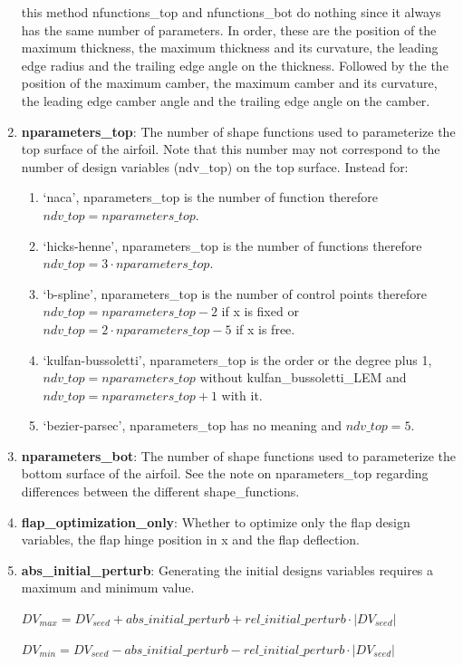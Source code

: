 \documentclass[11pt]{article}
\begin{document}
\begin{enumerate}
{\begin{enumerate}
	this method nfunctions\_top and nfunctions\_bot do nothing since it always has the same number
	of parameters. In order, these are the position of the maximum thickness, the maximum thickness and its curvature,
	the leading edge radius and the trailing edge angle on the thickness. Followed by the the position of the maximum camber, the maximum camber and its curvature, the leading edge camber angle and the trailing edge angle on the camber. 
\end{enumerate}}
\item{\textbf{nparameters\_top}: The number of shape functions used to parameterize the top
	surface of the airfoil.  Note that this number may not correspond to the number of design variables (ndv\_top)
	on the top surface. Instead for:
	\begin{enumerate}
		\item  `naca', nparameters\_top is the number of function therefore $ndv\_top=nparameters\_top$.
		\item `hicks-henne', nparameters\_top is the number of functions therefore $ndv\_top=3 \cdot nparameters\_top$.
		\item `b-spline', nparameters\_top is the number of control points therefore $ndv\_top=nparameters\_top - 2$ if x is fixed or $ndv\_top=2 \cdot nparameters\_top - 5$ if x is free.
		\item `kulfan-bussoletti', nparameters\_top is the order or the degree plus 1, $ndv\_top=nparameters\_top$ without kulfan\_bussoletti\_LEM and $ndv\_top=nparameters\_top + 1$ with it.
		\item `bezier-parsec', nparameters\_top has no meaning and $ndv\_top=5$. 
	\end{enumerate}}
\item{\textbf{nparameters\_bot}: The number of shape functions used to parameterize the
	bottom surface of the airfoil.  See the note on nparameters\_top regarding differences
	between the different shape\_functions.}
\item{\textbf{flap\_optimization\_only}: Whether to optimize only the flap design variables,
	the flap hinge position in x and the flap deflection.}
\item{\textbf{abs\_initial\_perturb}: Generating the initial designs variables requires a maximum and minimum
	value. 
	
	$DV_{max} = DV_{seed} + abs\_initial\_perturb + rel\_initial\_perturb \cdot |DV_{seed}|$
	
	$DV_{min} = DV_{seed} - abs\_initial\_perturb - rel\_initial\_perturb \cdot |DV_{seed}|$
	
}
\end{enumerate}
\end{document}

